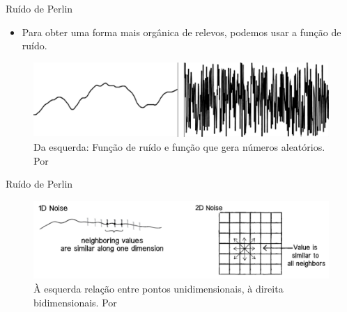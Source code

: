 
\begin{frame}{Ruído de Perlin}
    \begin{itemize}\setlength\itemsep{1em}
        \item Para obter uma forma mais orgânica de relevos, podemos usar a função de ruído.  
    \end{itemize}
    \begin{figure}[H]
        \centering
        \includegraphics[width=.75\textwidth]{img/randomAndNoise}
        \caption{Da esquerda: Função de ruído e função que gera números aleatórios. Por \cite{shiffman2012nature}}
        \label{fig:randomAndNoise}
    \end{figure}
    
\end{frame}

\begin{frame}{Ruído de Perlin}
    \begin{figure}[H]
        \centering
        \includegraphics[width=.75\textwidth]{img/1dto2dnoise}
        \caption{À esquerda relação entre pontos unidimensionais, à direita bidimensionais. Por \cite{shiffman2012nature}}
        \label{fig:1dto2dnoise}
    \end{figure}
    
\end{frame}



